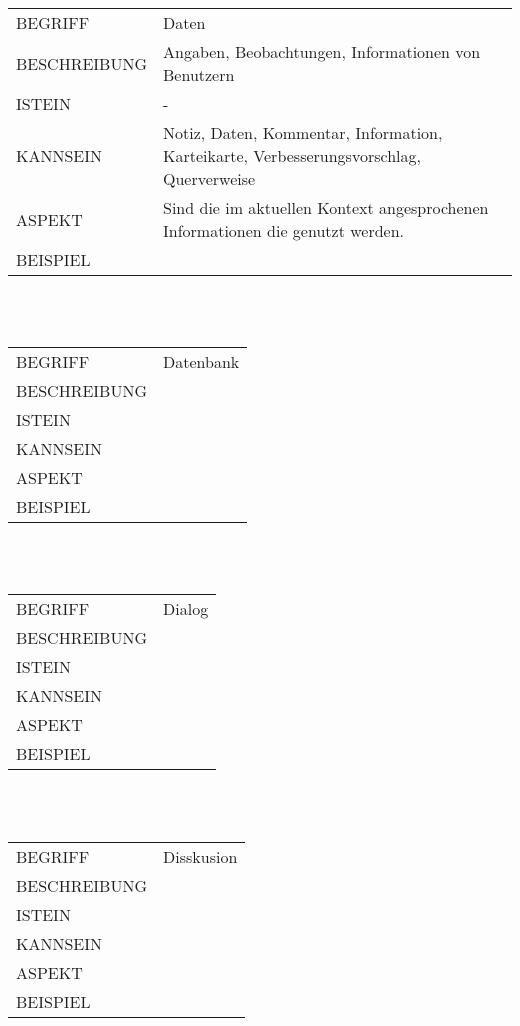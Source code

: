 \documentclass[12pt,a4paper]{article}
\begin{document}
\begin{tabular}{l p{10cm}}
BEGRIFF 	 & Daten \\ 
BESCHREIBUNG & Angaben, Beobachtungen, Informationen von Benutzern\\ 
ISTEIN   	 & -\\
KANNSEIN 	 & Notiz, Daten, Kommentar, Information, Karteikarte, Verbesserungsvorschlag, 					   Querverweise\\ 
ASPEKT   	 & Sind die im aktuellen Kontext angesprochenen Informationen die genutzt werden.\\
BEISPIEL 	 & \\
\hline
\end{tabular}\\\\  

\begin{tabular}{l p{10cm}}
BEGRIFF 	 & Datenbank \\ 
BESCHREIBUNG & \\ 
ISTEIN   	 & \\
KANNSEIN 	 & \\ 
ASPEKT   	 & \\
BEISPIEL 	 & \\
\hline
\end{tabular}\\\\ 

\begin{tabular}{l p{10cm}}
BEGRIFF 	 & Dialog \\ 
BESCHREIBUNG & \\ 
ISTEIN   	 & \\
KANNSEIN 	 & \\ 
ASPEKT   	 & \\
BEISPIEL 	 & \\
\hline
\end{tabular}\\\\  

\begin{tabular}{l p{10cm}}
BEGRIFF 	 & Disskusion \\ 
BESCHREIBUNG & \\ 
ISTEIN   	 & \\
KANNSEIN 	 & \\ 
ASPEKT   	 & \\
BEISPIEL 	 & \\
\hline
\end{tabular}\\\\  
\end{document}
